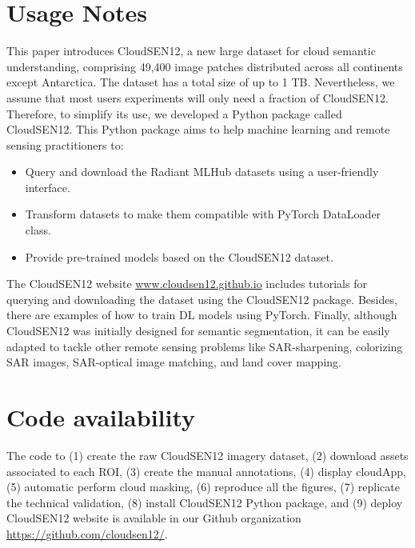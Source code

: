 \documentclass[a4paper, nobind]{templates/cdethesis}
\begin{document}
\hypertarget{usage-notes}{%
\section{Usage Notes}\label{usage-notes}}

This paper introduces CloudSEN12, a new large dataset for cloud semantic understanding, comprising 49,400 image patches distributed across all continents except Antarctica. The dataset has a total size of up to 1 TB. Nevertheless, we assume that most users experiments will only need a fraction of CloudSEN12. Therefore, to simplify its use, we developed a Python package called CloudSEN12. This Python package aims to help machine learning and remote sensing practitioners to:

\begin{itemize}
  \item Query and download the Radiant MLHub datasets using a user-friendly interface.
  \item Transform datasets to make them compatible with PyTorch DataLoader class.
  \item Provide pre-trained models based on the CloudSEN12 dataset.
\end{itemize}

The CloudSEN12 website \href{www.cloudsen12.github.io}{www.cloudsen12.github.io} includes tutorials for querying and downloading the dataset using the CloudSEN12 package. Besides, there are examples of how to train DL models using PyTorch. Finally, although CloudSEN12 was initially designed for semantic segmentation, it can be easily adapted to tackle other remote sensing problems like SAR-sharpening\cite{Schmitt2018a}, colorizing SAR images\cite{Schmitt2018b}, SAR-optical image matching\cite{Hughes2018}, and land cover mapping\cite{Karra2021}.

\hypertarget{code-availability}{%
\section{Code availability}\label{code-availability}}

The code to (1) create the raw CloudSEN12 imagery dataset, (2) download assets associated to each ROI, (3) create the manual annotations, (4) display cloudApp, (5) automatic perform cloud masking, (6) reproduce all the figures, (7) replicate the technical validation, (8) install CloudSEN12 Python package, and (9) deploy CloudSEN12 website is available in our Github organization \href{https://github.com/cloudsen12/}{https://github.com/cloudsen12/}.
\end{document}
